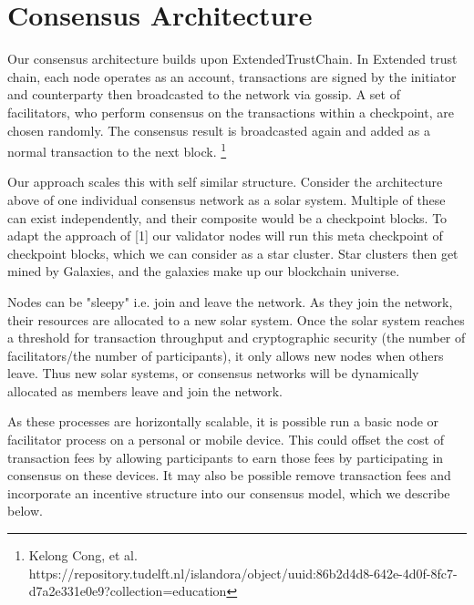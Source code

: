 \documentclass{article}
\begin{document}
\section{Consensus Architecture}
Our consensus architecture builds upon ExtendedTrustChain. In Extended trust chain, each node operates as an account, transactions are signed by the initiator and counterparty then broadcasted to the network via gossip. A set of facilitators, who perform consensus on the transactions within a checkpoint, are chosen randomly. The consensus result is broadcasted again and added as a normal transaction to the next block. \footnote{Kelong Cong, et al. https://repository.tudelft.nl/islandora/object/uuid:86b2d4d8-642e-4d0f-8fc7-d7a2e331e0e9?collection=education} 

Our approach scales this with self similar structure. Consider the architecture above of one individual consensus network as a solar system. Multiple of these can exist independently, and their composite would be a checkpoint blocks. To adapt the approach of [1] our validator nodes will run this meta checkpoint of checkpoint blocks, which we can consider as a star cluster. Star clusters then get mined by Galaxies, and the galaxies make up our blockchain universe.

Nodes can be "sleepy" i.e. join and leave the network. As they join the network, their resources are allocated to a new solar system. Once the solar system reaches a threshold for transaction throughput and cryptographic security (the number of facilitators/the number of participants), it only allows new nodes when others leave. Thus new solar systems, or consensus networks will be dynamically allocated as members leave and join the network.

As these processes are horizontally scalable, it is possible run a basic node or facilitator process on a personal or mobile device. This could offset the cost of transaction fees by allowing participants to earn those fees by participating in consensus on these devices. It may also be possible remove transaction fees and incorporate an incentive structure into our consensus model, which we describe below.
\end{document}
